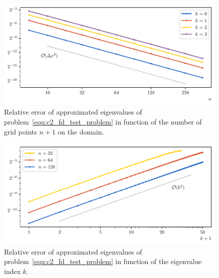 \begin{figure}
    \begin{center}
        \includegraphics[width=\textwidth]{img/chapter2/finite_difference_h_error.pdf}
    \end{center}
    \caption{Relative error of approximated eigenvalues of problem~\eqref{equ:c2_fd_test_problem} in function of the number of grid points $n+1$ on the domain.}
    \label{fig:c2_fd_h_error}
\end{figure}

\begin{figure}
    \begin{center}
        \includegraphics[width=\textwidth]{img/chapter2/finite_difference_k_error.pdf}
    \end{center}
    \caption{Relative error of approximated eigenvalues of problem~\eqref{equ:c2_fd_test_problem} in function of the eigenvalue index $k$.}
    \label{fig:c2_fd_k_error}
\end{figure}

